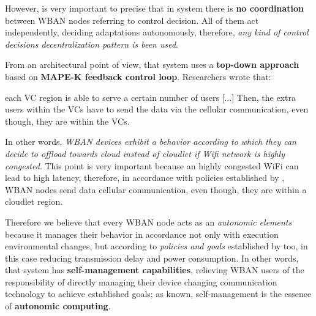 \documentclass[sigchi]{acmart}
\begin{document}
However, is very important to precise that in \citet{MSAReport} system there is \textbf{no coordination} between WBAN nodes referring to control decision. All  of them act independently, deciding adaptations autonomously, therefore, \textit{any kind of control decisions decentralization pattern is been used}.  

From an architectural point of view, that system uses a \textbf{top-down approach} based on \textbf{MAPE-K feedback control loop}. Researchers wrote that:

\vspace{0.3cm}

\begin{quoting}[font=itshape, begintext={``}, endtext={''\cite[par.~5.1]{MSAReport}}]
each VC region is able to serve a certain number of users [...] Then, the extra users within the VCs have to send the data via the cellular communication, even though, they are within the VCs. 
\end{quoting}

\vspace{0.3cm}

In other words, \textit{WBAN devices exhibit a behavior according to which they can decide to offload towards cloud instead of cloudlet if Wifi network is highly congested}. This point is very important because an highly congested WiFi can lead to high latency, therefore, in accordance with policies established by \citet{MSAReport}, WBAN nodes  send data cellular communication, even though, they are within a cloudlet region.  

Therefore we believe that every WBAN node acts as an \textit{autonomic elements} because it manages their behavior in accordance not only with execution environmental changes, but according to \textit{policies and goals} established by \citet{MSAReport} too, in this case reducing transmission delay and power consumption. In other words, that system has \textbf{self-management capabilities}, relieving WBAN users of the responsibility of directly managing their device changing communication technology to achieve established goals; as known, self-management is the essence of \textbf{autonomic computing}.\cite{visionOf} 
\end{document}
